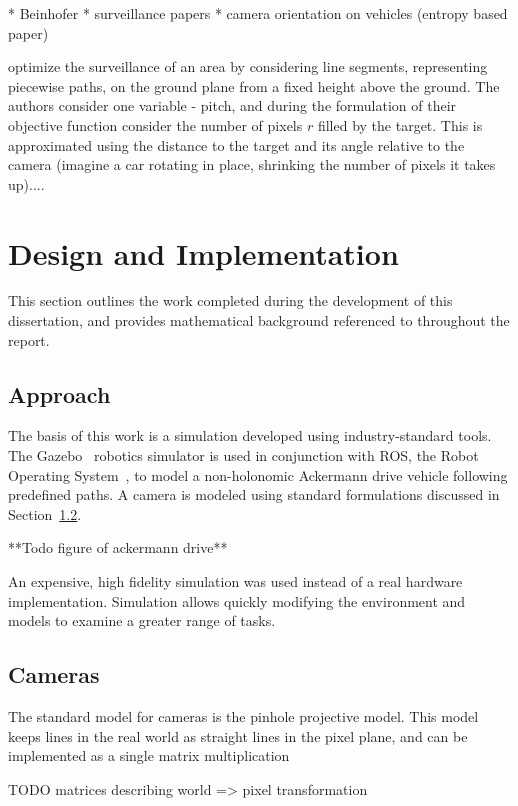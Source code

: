 \documentclass[a4paper,12pt,twoside,openright]{report}
\begin{document}
* Beinhofer
* surveillance papers
* camera orientation on vehicles (entropy based paper)

\citeauthor{bodor2007optimal} optimize the surveillance of an area by considering
line segments, representing piecewise paths, on the ground plane from a fixed
height above the ground. The authors consider one variable - pitch,
and during the formulation of their
objective function consider the number of pixels $r$ filled by the target.
This is approximated using the distance to the target and its angle relative 
to the camera (imagine a car rotating in place, shrinking the number
of pixels it takes up).... 

\chapter{Design and Implementation}
\label{chap:impl}

This section outlines the work completed during the development
of this dissertation, and provides mathematical background
referenced to throughout the report.

\section{Approach}

The basis of this work is a simulation developed using industry-standard tools.
The Gazebo~\cite{koenig2004design} robotics simulator is used in conjunction with ROS,
the Robot Operating System~\cite{quigley2009ros}, to model a non-holonomic Ackermann drive vehicle
following predefined paths. A camera is modeled using standard formulations
discussed in Section~\ref{impl:sensors}.

**Todo figure of ackermann drive**

An expensive, high fidelity simulation was used instead of a real hardware
implementation. Simulation allows quickly modifying the environment
and models to examine a greater range of tasks.


\section{Cameras}
\label{impl:sensors}

The standard model for cameras is the pinhole projective model. This model 
keeps lines in the real world as straight lines in the pixel plane,
and can be implemented as a single matrix multiplication

TODO matrices describing world => pixel transformation
\end{document}
